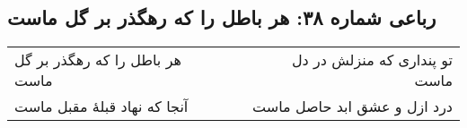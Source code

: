 \begin{center}
\section*{رباعی شماره ۳۸: هر باطل را که رهگذر بر گل ماست}
\label{sec:sh038}
\begin{longtable}{l p{0.5cm} r}
هر باطل را که رهگذر بر گل ماست
&&
تو پنداری که منزلش در دل ماست
\\
آنجا که نهاد قبلهٔ مقبل ماست
&&
درد ازل و عشق ابد حاصل ماست
\\
\end{longtable}
\end{center}
